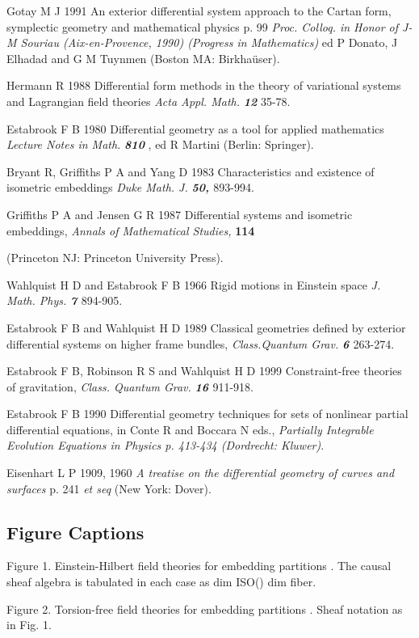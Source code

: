 \documentclass[a4paper,a4paper]{article}
\begin{document}
\begin{thebibliography}{10}

Gotay M J 1991 An exterior differential system approach to the Cartan
form,  symplectic geometry and mathematical physics p. 99 {\itshape
Proc. Colloq. in Honor of J-M Souriau (Aix-en-Provence,  1990) (Progress in
Mathematics) }ed P Donato,  J Elhadad and G M Tuynmen (Boston MA:
Birkha\"{u}ser).

Hermann R 1988 Differential form methods in the theory of variational
systems and Lagrangian field theories {\itshape Acta Appl. Math.
}{\bfseries {\itshape 12}} 35-78.

Estabrook F B 1980 Differential geometry as a tool for applied
mathematics {\itshape Lecture Notes in Math. }{\bfseries {\itshape 810}}
,  ed R Martini (Berlin:  Springer).

Bryant R,  Griffiths P A and Yang D 1983 Characteristics and existence
of isometric embeddings {\itshape Duke Math. J. }{\bfseries {\itshape
50,  }}893-994.

Griffiths P A and Jensen G R 1987 Differential systems and isometric
embeddings,  {\itshape Annals of Mathematical Studies,  }{\bfseries 114}

(Princeton NJ:  Princeton University Press).

Wahlquist H D and Estabrook F B 1966  Rigid motions in Einstein space
{\itshape J. Math. Phys. }{\bfseries {\itshape 7  }}894-905.

Estabrook F B and Wahlquist H D 1989 Classical geometries defined by
exterior differential systems on higher frame bundles,  {\itshape
Class.Quantum Grav. }{\bfseries {\itshape 6 }}263-274.

Estabrook F B,  Robinson R S and Wahlquist H D 1999  Constraint-free
theories of gravitation,  {\itshape Class. Quantum Grav. }{\bfseries
{\itshape 16 }}911-918.

Estabrook F B 1990 Differential geometry techniques for sets of
nonlinear partial differential equations,  in Conte R and Boccara N
eds., {\itshape Partially Integrable Evolution Equations in Physics p. 413-434
(Dordrecht: Kluwer)}.

Eisenhart L P 1909,  1960  {\itshape A treatise on the differential
geometry of curves and surfaces }p. 241 {\itshape et seq }(New York:
Dover).
\end{thebibliography}

\subsection*{Figure Captions}

Figure 1.  Einstein-Hilbert field theories for embedding partitions \coordHE{}.  The causal sheaf algebra is tabulated in each case
as dim ISO(\coordHE{}) \coordHE{} dim
fiber.

Figure 2.  Torsion-free field theories for embedding partitions \coordHE{}.  Sheaf notation as in Fig. 1.
\end{document}
